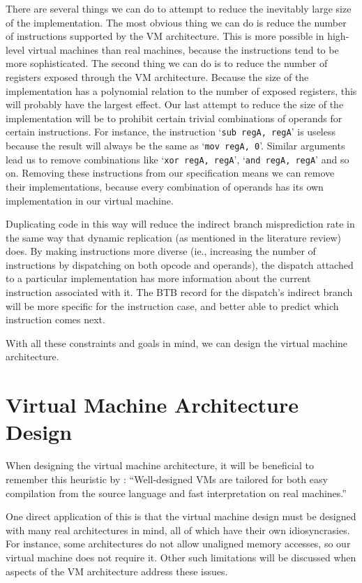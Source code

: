 	There are several things we can do to attempt to reduce the inevitably large size of the implementation. The most obvious thing we can do is reduce the number of instructions supported by the VM architecture. This is more possible in high-level virtual machines than real machines, because the instructions tend to be more sophisticated. The second thing we can do is to reduce the number of registers exposed through the VM architecture. Because the size of the implementation has a polynomial relation to the number of exposed registers, this will probably have the largest effect. Our last attempt to reduce the size of the implementation will be to prohibit certain trivial combinations of operands for certain instructions. For instance, the instruction `\texttt{sub regA, regA}' is useless because the result will always be the same as `\texttt{mov regA, 0}'. Similar arguments lead us to remove combinations like `\texttt{xor regA, regA}', `\texttt{and regA, regA}' and so on. Removing these instructions from our specification means we can remove their implementations, because every combination of operands has its own implementation in our virtual machine.
	
	Duplicating code in this way will reduce the indirect branch misprediction rate in the same way that dynamic replication (as mentioned in the literature review) does. By making instructions more diverse (ie., increasing the number of instructions by dispatching on both opcode and operands), the dispatch attached to a particular implementation has more information about the current instruction associated with it. The BTB record for the dispatch's indirect branch will be more specific for the instruction case, and better able to predict which instruction comes next.
	
	With all these constraints and goals in mind, we can design the virtual machine architecture.
	
	\section{Virtual Machine Architecture Design}
		When designing the virtual machine architecture, it will be beneficial to remember this heuristic by \cite{structureinterpreters}: ``Well-designed VMs are tailored for both easy compilation from the source language and fast interpretation on real machines.''
		
		One direct application of this is that the virtual machine design must be designed with many real architectures in mind, all of which have their own idiosyncrasies. For instance, some architectures do not allow unaligned memory accesses, so our virtual machine does not require it. Other such limitations will be discussed when aspects of the VM architecture address these issues.
		
